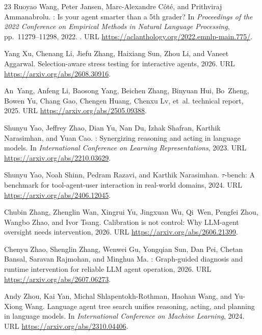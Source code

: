 \begin{thebibliography}{23}
Ruoyao Wang, Peter Jansen, Marc-Alexandre C\^{o}t\'{e}, and Prithviraj
  Ammanabrolu.
: Is your agent smarter than a 5th grader?
\newblock In \emph{Proceedings of the 2022 Conference on Empirical Methods in
  Natural Language Processing}, pp.\  11279--11298, 2022.
\newblock {}.
\newblock URL \url{https://aclanthology.org/2022.emnlp-main.775/}.

Yang Xu, Chenang Li, Jiefu Zhang, Haixiang Sun, Zhou Li, and Vaneet Aggarwal.
\newblock Selection-aware stress testing for interactive agents, 2026.
\newblock URL \url{https://arxiv.org/abs/2608.30916}.

An~Yang, Anfeng Li, Baosong Yang, Beichen Zhang, Binyuan Hui, Bo~Zheng, Bowen
  Yu, Chang Gao, Chengen Huang, Chenxu Lv, et~al.
 technical report, 2025.
\newblock URL \url{https://arxiv.org/abs/2505.09388}.

Shunyu Yao, Jeffrey Zhao, Dian Yu, Nan Du, Izhak Shafran, Karthik Narasimhan,
  and Yuan Cao.
: Synergizing reasoning and acting in language models.
\newblock In \emph{International Conference on Learning Representations}, 2023.
\newblock URL \url{https://arxiv.org/abs/2210.03629}.

Shunyu Yao, Noah Shinn, Pedram Razavi, and Karthik Narasimhan.
\newblock $\tau$-bench: A benchmark for tool-agent-user interaction in
  real-world domains, 2024.
\newblock URL \url{https://arxiv.org/abs/2406.12045}.

Chubin Zhang, Zhenglin Wan, Xingrui Yu, Jingxuan Wu, Qi~Wen, Pengfei Zhou,
  Wangbo Zhao, and Ivor Tsang.
\newblock Calibration is not control: Why {LLM}-agent oversight needs
  intervention, 2026.
\newblock URL \url{https://arxiv.org/abs/2606.21399}.

Chenyu Zhao, Shenglin Zhang, Wenwei Gu, Yongqian Sun, Dan Pei, Chetan Bansal,
  Saravan Rajmohan, and Minghua Ma.
: Graph-guided diagnosis and runtime intervention for
  reliable {LLM} agent operation, 2026.
\newblock URL \url{https://arxiv.org/abs/2607.06273}.

Andy Zhou, Kai Yan, Michal Shlapentokh-Rothman, Haohan Wang, and Yu-Xiong Wang.
\newblock Language agent tree search unifies reasoning, acting, and planning in
  language models.
\newblock In \emph{International Conference on Machine Learning}, 2024.
\newblock URL \url{https://arxiv.org/abs/2310.04406}.

\end{thebibliography}


